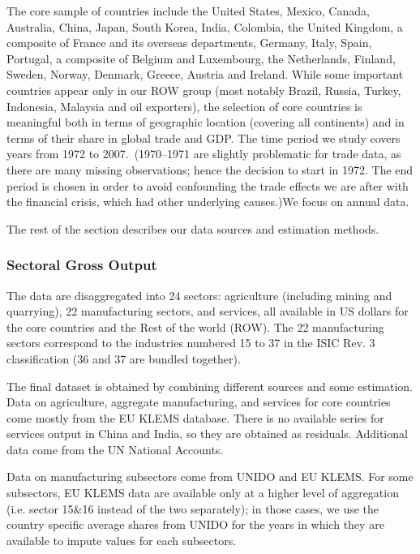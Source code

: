 \documentclass[12pt]{article}
\begin{document}
The core sample of countries include the United States, Mexico, Canada,
Australia, China, Japan, South Korea, India, Colombia, the United Kingdom, a
composite of France and its overseas departments, Germany, Italy, Spain,
Portugal, a composite of Belgium and Luxembourg, the Netherlands, Finland,
Sweden, Norway, Denmark, Greece, Austria and Ireland. While some important
countries appear only in our ROW group (most notably Brazil, Russia, Turkey,
Indonesia, Malaysia and oil exporters), the selection of core countries is
meaningful both in terms of geographic location (covering all continents)
and in terms of their share in global trade and GDP. The time period we
study covers years from 1972 to 2007.\ (1970--1971 are slightly problematic
for trade data, as there are many missing observations; hence the decision
to start in 1972. The end period is chosen in order to avoid confounding the
trade effects we are after with the financial crisis, which had other
underlying causes.)We focus on annual data.

The rest of the section describes our data sources and estimation methods.

\subsubsection{Sectoral Gross Output}

The data are disaggregated into 24 sectors: agriculture (including mining
and quarrying), 22 manufacturing sectors, and services, all available in US
dollars for the core countries and the Rest of the world (ROW). The 22
manufacturing sectors correspond to the industries numbered 15 to 37 in the
ISIC Rev. 3 classification (36 and 37 are bundled together).

The final dataset is obtained by combining different sources and some
estimation. Data on agriculture, aggregate manufacturing, and services for
core countries come mostly from the EU KLEMS database. There is no available
series for services output in China and India, so they are obtained as
residuals. Additional data come from the UN National Accounts.

Data on manufacturing subsectors come from UNIDO and EU KLEMS. For some
subsectors, EU KLEMS data are available only at a higher level of
aggregation (i.e. sector 15\&16 instead of the two separately); in those
cases, we use the country specific average shares from UNIDO for the years
in which they are available to impute values for each subsectors.
\end{document}
